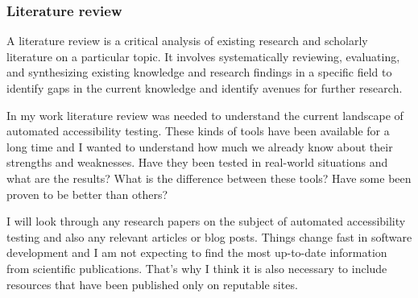 \documentclass{master_thesis}
\begin{document}
\subsubsection{Literature review}


A literature review is a critical analysis of existing research and scholarly literature on a particular topic. It involves systematically reviewing, evaluating, and synthesizing existing knowledge and research findings in a specific field to identify gaps in the current knowledge and identify avenues for further research. 



In my work literature review was needed to understand the current landscape of automated accessibility testing. These kinds of tools have been available for a long time and I wanted to understand how much we already know about their strengths and weaknesses. Have they been tested in real-world situations and what are the results? What is the difference between these tools? Have some been proven to be better than others?



I will look through any research papers on the subject of automated accessibility testing and also any relevant articles or blog posts. Things change fast in software development and I am not expecting to find the most up-to-date information from scientific publications. That's why I think it is also necessary to include resources that have been published only on reputable sites.

\end{document}
